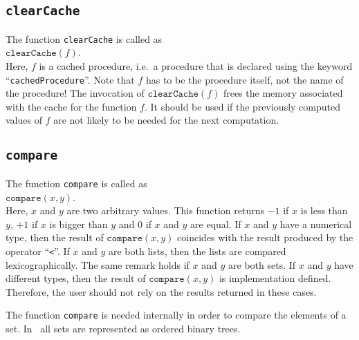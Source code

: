 \subsection{\texttt{clearCache}}
The function \texttt{clearCache}  is called as
\\[0.2cm]
\hspace*{1.3cm}
$\mathtt{clearCache}(f)$.
\\[0.2cm]
Here, $f$ is a cached procedure, i.e.~a procedure that is declared using the
keyword ``\texttt{cachedProcedure}''.  Note that $f$ has to be the procedure itself, not
the name of the procedure!  The invocation of $\texttt{clearCache}(f)$ frees the memory
associated with the cache for the function $f$.  It should be used if the previously
computed values of $f$ are not likely to be needed for the next computation.

\subsection{\texttt{compare}}
The function \texttt{compare}  is called as
\\[0.2cm]
\hspace*{1.3cm}
$\mathtt{compare}(x, y)$.
\\[0.2cm]
Here, $x$ and $y$ are two arbitrary values.  This function returns $-1$ if $x$ is less
than $y$, $+1$ if $x$ is bigger than $y$ and $0$ if $x$ and $y$ are equal.
If $x$ and $y$ have a numerical type,  then the result of $\mathtt{compare}(x,y)$
coincides with the result produced by the operator ``\texttt{<}''.
If $x$ and $y$ are both lists, then the lists are compared lexicographically.
The same remark holds if $x$ and $y$ are both sets.   If $x$ and $y$ have different types,
then the result of $\mathtt{compare}(x, y)$ is implementation defined.  Therefore, the
user should not rely on the results returned in these cases.

The function \texttt{compare} is needed internally in order to compare the elements of a
set.  In \setlx\ all sets are represented as ordered binary trees.

